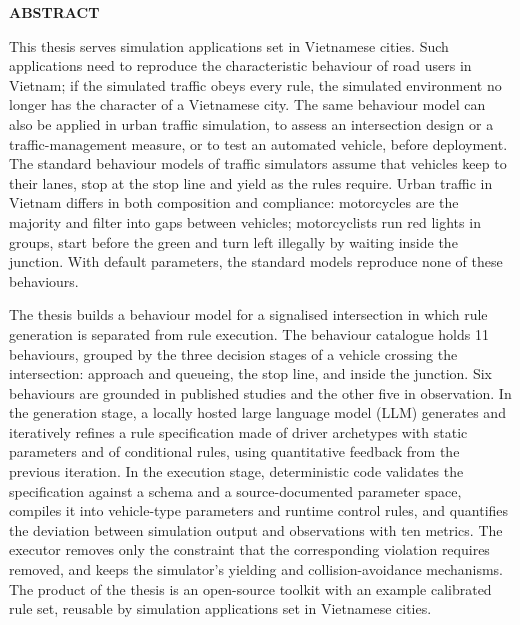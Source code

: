 \documentclass[../main.tex]{subfiles}
\begin{document}
\begin{center}
    \Large{\textbf{ABSTRACT}}\\
\end{center}
\vspace{0.6cm}

This thesis serves simulation applications set in Vietnamese cities. Such applications need to reproduce the characteristic behaviour of road users in Vietnam; if the simulated traffic obeys every rule, the simulated environment no longer has the character of a Vietnamese city. The same behaviour model can also be applied in urban traffic simulation, to assess an intersection design or a traffic-management measure, or to test an automated vehicle, before deployment. The standard behaviour models of traffic simulators assume that vehicles keep to their lanes, stop at the stop line and yield as the rules require. Urban traffic in Vietnam differs in both composition and compliance: motorcycles are the majority and filter into gaps between vehicles; motorcyclists run red lights in groups, start before the green and turn left illegally by waiting inside the junction. With default parameters, the standard models reproduce none of these behaviours.

The thesis builds a behaviour model for a signalised intersection in which rule generation is separated from rule execution. The behaviour catalogue holds 11 behaviours, grouped by the three decision stages of a vehicle crossing the intersection: approach and queueing, the stop line, and inside the junction. Six behaviours are grounded in published studies and the other five in observation. In the generation stage, a locally hosted large language model (LLM) generates and iteratively refines a rule specification made of driver archetypes with static parameters and of conditional rules, using quantitative feedback from the previous iteration. In the execution stage, deterministic code validates the specification against a schema and a source-documented parameter space, compiles it into vehicle-type parameters and runtime control rules, and quantifies the deviation between simulation output and observations with ten metrics. The executor removes only the constraint that the corresponding violation requires removed, and keeps the simulator's yielding and collision-avoidance mechanisms. The product of the thesis is an open-source toolkit with an example calibrated rule set, reusable by simulation applications set in Vietnamese cities.
\end{document}
